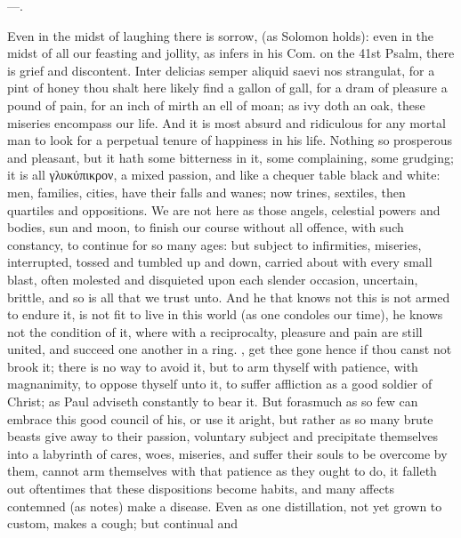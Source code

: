 {---.

Even in the midst of laughing there is sorrow, (as Solomon holds):
even in the midst of all our feasting and jollity, as \Austin{}
infers in his Com. on the 41st Psalm, there is grief and discontent.
Inter delicias semper aliquid saevi nos strangulat, for a pint of honey
thou shalt here likely find a gallon of gall, for a dram of pleasure a
pound of pain, for an inch of mirth an ell of moan; as ivy doth an oak,
these miseries encompass our life. And it is most absurd and ridiculous
for any mortal man to look for a perpetual tenure of happiness in his
life. Nothing so prosperous and pleasant, but it hath some
bitterness in it, some complaining, some grudging; it is all
\textgreek{γλυκύπικρον}, a mixed passion,
and like a chequer table black and white: men, families, cities, have their falls and wanes; now trines,
sextiles, then quartiles and oppositions. We are not here as those
angels, celestial powers and bodies, sun and moon, to finish our course
without all offence, with such constancy, to continue for so many ages:
but subject to infirmities, miseries, interrupted, tossed and tumbled
up and down, carried about with every small blast, often molested and
disquieted upon each slender occasion, uncertain, brittle, and so
is all that we trust unto.  And he that knows not this is not
armed to endure it, is not fit to live in this world (as one condoles
our time), he knows not the condition of it, where with a reciprocalty,
pleasure and pain are still united, and succeed one another in a ring.
, get thee gone hence if thou canst not brook it; there is
no way to avoid it, but to arm thyself with patience, with magnanimity,
to oppose thyself unto it, to suffer affliction as a good soldier
of Christ; as Paul adviseth constantly to bear it. But forasmuch
as so few can embrace this good council of his, or use it aright, but
rather as so many brute beasts give away to their passion, voluntary
subject and precipitate themselves into a labyrinth of cares, woes,
miseries, and suffer their souls to be overcome by them, cannot arm
themselves with that patience as they ought to do, it falleth out
oftentimes that these dispositions become habits, and many affects
contemned (as \Seneca notes) make a disease. Even as one
distillation, not yet grown to custom, makes a cough; but continual and
}
